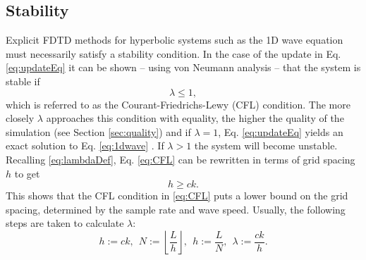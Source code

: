 \subsection{Stability}\label{sec:stability}
Explicit FDTD methods for hyperbolic systems such as the 1D wave equation must necessarily satisfy a stability condition. In the case of the update in Eq. \eqref{eq:updateEq} it can be shown -- using von Neumann analysis \cite{Strikwerda1989} -- that the system is stable if
\begin{equation}\label{eq:CFL}
    \lambda \leq 1,
\end{equation}
which is referred to as the Courant-Friedrichs-Lewy (CFL) condition. The more closely $\lambda$ approaches this condition with equality, the higher the quality of the simulation (see Section \ref{sec:quality}) and if $\lambda = 1$, Eq. \eqref{eq:updateEq} yields an exact solution to Eq. \eqref{eq:1dwave}%
. If $\lambda > 1$ the system will become unstable.
%
%
Recalling \eqref{eq:lambdaDef}, Eq. \eqref{eq:CFL} can be rewritten in terms of grid spacing $h$ to get
\begin{equation}\label{eq:stabilityCond}
    h \geq ck.
\end{equation}
This shows that the CFL condition in \eqref{eq:CFL} puts a lower bound on the grid spacing, determined by the sample rate and wave speed. Usually, the following steps are taken to calculate $\lambda$:
\begin{equation}\label{eq:orderOfCalcGrid}
    h := ck,\ \ N := \left\lfloor\frac{L}{h}\right\rfloor, \ \ h := \frac{L}{N}, \ \ \lambda := \frac{ck}{h}.
\end{equation}
